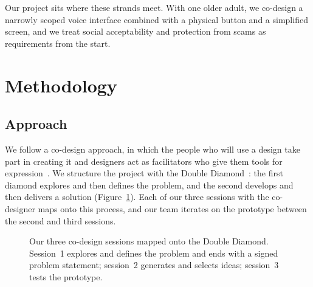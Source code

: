 \documentclass[acmtog,nonacm]{acmart}
\begin{document}
Our project sits where these strands meet. With one older adult, we co-design a narrowly scoped voice interface combined with a physical button and a simplified screen, and we treat social acceptability and protection from scams as requirements from the start.


\section{Methodology}\label{sec:method}

\subsection{Approach}
We follow a co-design approach, in which the people who will use a design take part in creating it and designers act as facilitators who give them tools for expression~\cite{sanders2008cocreation}. We structure the project with the Double Diamond~\cite{designcouncil2004double}: the first diamond explores and then defines the problem, and the second develops and then delivers a solution (Figure~\ref{fig:diamond}). Each of our three sessions with the co-designer maps onto this process, and our team iterates on the prototype between the second and third sessions.

\begin{figure}[t]
  \centering
  \caption{Our three co-design sessions mapped onto the Double Diamond. Session~1 explores and defines the problem and ends with a signed problem statement; session~2 generates and selects ideas; session~3 tests the prototype.}
  \label{fig:diamond}
\end{figure}
\end{document}
